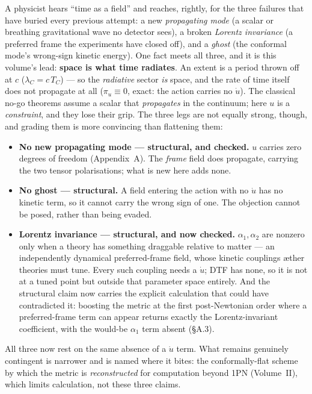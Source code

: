 \documentclass[11pt]{article}
\begin{document}
\noindent A physicist hears ``time as a field'' and reaches, rightly, for the three failures that have
buried every previous attempt: a new \emph{propagating mode} (a scalar or breathing gravitational wave
no detector sees), a broken \emph{Lorentz invariance} (a preferred frame the experiments have closed
off), and a \emph{ghost} (the conformal mode's wrong-sign kinetic energy). One fact meets all three, and
it is this volume's lead: \textbf{space is what time radiates}. An extent is a period thrown off at $c$
($\lambda_C=c\,T_C$) --- so the \emph{radiative} sector \emph{is} space, and the rate of time itself does
not propagate at all ($\pi_u\equiv0$, exact: the action carries no $\dot u$). The classical no-go theorems
assume a scalar that \emph{propagates} in the continuum; here $u$ is a \emph{constraint}, and they lose
their grip. The three legs are not equally strong, though, and grading them is more convincing than
flattening them:
\begin{itemize}[leftmargin=1.5em,itemsep=2pt,topsep=3pt]
  \item \textbf{No new propagating mode --- structural, and checked.} $u$ carries zero degrees of freedom
    (Appendix~A). The \emph{frame} field does propagate, carrying the two tensor polarisations; what is new
    here adds none.
  \item \textbf{No ghost --- structural.} A field entering the action with no $\dot u$ has no kinetic term,
    so it cannot carry the wrong sign of one. The objection cannot be posed, rather than being evaded.
  \item \textbf{Lorentz invariance --- structural, and now checked.} $\alpha_1,\alpha_2$ are nonzero only
    when a theory has something draggable relative to matter --- an independently dynamical preferred-frame
    field, whose kinetic couplings \ae ther theories must tune. Every such coupling needs a $\dot u$; DTF has
    none, so it is not at a tuned point but outside that parameter space entirely. And the structural claim
    now carries the explicit calculation that could have contradicted it: boosting the metric at the first
    post-Newtonian order where a preferred-frame term can appear returns exactly the Lorentz-invariant
    coefficient, with the would-be $\alpha_1$ term absent (\S A.3).
\end{itemize}
\noindent All three now rest on the same absence of a $\dot u$ term. What remains genuinely contingent is
narrower and is named where it bites: the conformally-flat scheme by which the metric is \emph{reconstructed}
for computation beyond 1PN (Volume~II), which limits calculation, not these three claims.
\end{document}
